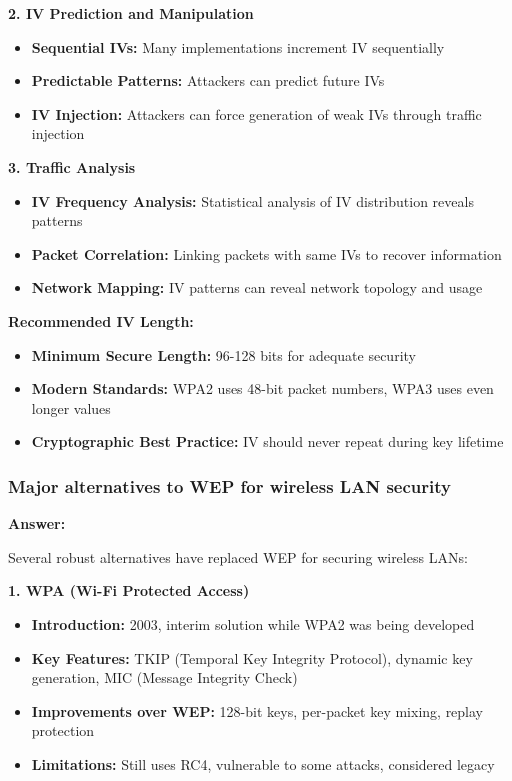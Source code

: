 \documentclass[12pt,a4paper]{article}
\begin{document}
\textbf{2. IV Prediction and Manipulation}
\begin{itemize}
    \item \textbf{Sequential IVs:} Many implementations increment IV sequentially
    \item \textbf{Predictable Patterns:} Attackers can predict future IVs
    \item \textbf{IV Injection:} Attackers can force generation of weak IVs through traffic injection
\end{itemize}

\textbf{3. Traffic Analysis}
\begin{itemize}
    \item \textbf{IV Frequency Analysis:} Statistical analysis of IV distribution reveals patterns
    \item \textbf{Packet Correlation:} Linking packets with same IVs to recover information
    \item \textbf{Network Mapping:} IV patterns can reveal network topology and usage
\end{itemize}

\textbf{Recommended IV Length:}
\begin{itemize}
    \item \textbf{Minimum Secure Length:} 96-128 bits for adequate security
    \item \textbf{Modern Standards:} WPA2 uses 48-bit packet numbers, WPA3 uses even longer values
    \item \textbf{Cryptographic Best Practice:} IV should never repeat during key lifetime
\end{itemize}

\subsubsection{Major alternatives to WEP for wireless LAN security}

\textbf{Answer:}

Several robust alternatives have replaced WEP for securing wireless LANs:

\textbf{1. WPA (Wi-Fi Protected Access)}
\begin{itemize}
    \item \textbf{Introduction:} 2003, interim solution while WPA2 was being developed
    \item \textbf{Key Features:} TKIP (Temporal Key Integrity Protocol), dynamic key generation, MIC (Message Integrity Check)
    \item \textbf{Improvements over WEP:} 128-bit keys, per-packet key mixing, replay protection
    \item \textbf{Limitations:} Still uses RC4, vulnerable to some attacks, considered legacy
\end{itemize}
\end{document}
